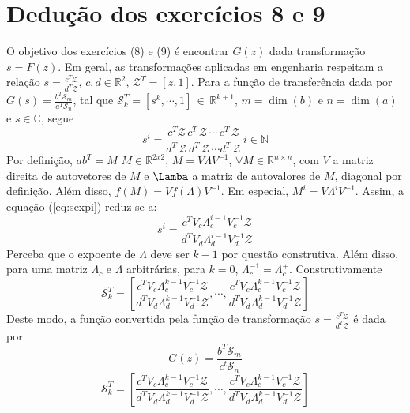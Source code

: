 \documentclass{article}
\begin{document}
\section*{Dedução dos exercícios 8 e 9}
\label{sec:deducao89}
O objetivo dos exercícios (8) e (9) é encontrar $G(z)$ dada transformação $s = F(z)$. Em geral, as transformações aplicadas em engenharia respeitam a relação $s = \frac{c^T \mathcal{Z}}{d^T \mathcal{Z}}$, $c, d \in \mathbb{R}^2$, $\mathcal{Z}^T = [z, 1] $. Para a função de transferência dada por $G(s) = \frac{b^T \mathcal{S}_m}{a^T \mathcal{S}_n}$, tal que $\mathcal{S}_k^T = [s^k, \cdots, 1]  \, \in \, \mathbb{R}^{k+1}$, $m = \dim(b)$ e $n = \dim(a)$ e $s \in \mathbb{C}$, segue
\begin{equation}
s^i = \frac{c^T \mathcal{Z} \, c^T \, \mathcal{Z} \, \cdots \, c^T \, \mathcal{Z}}{d^T \, \mathcal{Z} \, d^T \, \mathcal{Z} \, \cdots d^T \, \mathcal{Z}} \, i \in \mathbb{N}
\label{eq:sexpi}
\end{equation}
Por definição, $a b^T = M \,\, M \in \mathbb{R}^{2x2}$, $M = V \Lambda V^{-1}$, $\forall M \in \mathbb{R}^{n \times n}$, com $V$ a matriz direita de autovetores de $M$ e $\Lamba$ a matriz de autovalores de $M$, diagonal por definição. Além disso, $f(M) = V f(\Lambda) V^{-1}$. Em especial, $M^i = V \Lambda^i V^{-1}$. Assim, a equação (\ref{eq:sexpi}) reduz-se a:
\begin{equation}
s^i = \frac{c^T V_c \Lambda_c^{i-1} V_c^{-1} \mathcal{Z}}{d^T V_d \Lambda_d^{i-1} V_d^{-1} \mathcal{Z}}
\end{equation}
Perceba que o expoente de $\Lambda$ deve ser $k - 1$ por questão construtiva. Além disso, para uma matriz $\Lambda_c$ e $\Lambda$ arbitrárias, para $k = 0$, $\Lambda_c^{-1} = \Lambda_c^{+}$. Construtivamente
\begin{equation}
\mathcal{S}_k^T = \left[\frac{c^T V_c \Lambda_c^{k-1} V_c^{-1} \mathcal{Z}}{d^T V_d \Lambda_d^{k-1} V_d^{-1} \mathcal{Z}}, \cdots, \frac{c^T V_c \Lambda_c^{k-1} V_c^{-1} \mathcal{Z}}{d^T V_d \Lambda_d^{k-1} V_d^{-1} \mathcal{Z}}\right]
\end{equation}
Deste modo, a função convertida pela função de transformação $s = \frac{c^T \mathcal{Z}}{d^T \mathcal{Z}}$ é dada por
\begin{equation}
G(z) = \frac{b^T \mathcal{S}_m}{c^t \mathcal{S}_n}    
\end{equation}
\begin{equation}
\mathcal{S}_k^T = \left[\frac{c^T V_c \Lambda_c^{k-1} V_c^{-1} \mathcal{Z}}{d^T V_d \Lambda_d^{k-1} V_d^{-1} \mathcal{Z}}, \cdots, \frac{c^T V_c \Lambda_c^{k-1} V_c^{-1} \mathcal{Z}}{d^T V_d \Lambda_d^{k-1} V_d^{-1} \mathcal{Z}}\right]
\end{equation}
\end{document}

